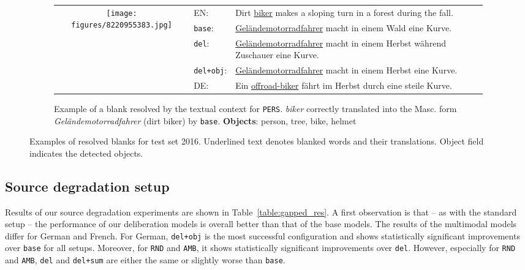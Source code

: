 \documentclass[11pt,a4paper]{article}
\newcommand{\base}{\texttt{base}\xspace}
\newcommand{\delib}{\texttt{del}\xspace}
\newcommand{\delibsum}{\texttt{del+sum}\xspace}
\newcommand{\delibattobj}{\texttt{del+obj}\xspace}
\newcommand{\rnd}{\texttt{RND}\xspace}
\newcommand{\amb}{\texttt{AMB}\xspace}
\newcommand{\pers}{\texttt{PERS}\xspace}
\begin{document}
\begin{figure*}[ht]
{\begin{subfigure}[c]{\textwidth}
  \end{subfigure}
  \begin{subfigure}[c]{\textwidth}
  \vspace{1em}
    \begin{tabular}{c p{1.5cm}p{9cm}}
      \multirow{3}{*}{\texttt{[image: figures/8220955383.jpg]}} & 
      EN: & Dirt \underline{biker} makes a sloping turn in a forest during the fall. \\[1ex]
      & \base: & \underline{Gel\"{a}ndemotorradfahrer} macht in einem Wald eine Kurve.\\[1ex]
      & \delib: & \underline{Gel\"{a}ndemotorradfahrer} macht in einem Herbst w\"{a}hrend Zuschauer eine Kurve.\\[1ex]
      & \delibattobj: & \underline{Gel\"{a}ndemotorradfahrer} macht in einem Herbst eine Kurve. \\[1ex]
      & DE: & Ein \underline{offroad-biker} f\"{a}hrt im Herbst durch eine steile Kurve.  \\[1ex]
  \end{tabular}
  \caption{Example of a blank resolved by the textual context for \pers. \textit{biker} correctly translated into the Masc. form \textit{Gel\"{a}ndemotorradfahrer} (dirt biker) by \base. \textbf{Objects}: person, tree, bike, helmet}
  \end{subfigure}}
\caption{\label{table:gapped_ex} Examples of resolved blanks for test set 2016. Underlined text denotes blanked words and their translations. Object field indicates the detected objects.}
\end{figure*}

\subsection{Source degradation setup}\label{ssec:gaps_results}

Results of our source degradation experiments are shown in Table~\ref{table:gapped_res}. A first observation is that -- as with the standard setup -- the performance of our deliberation models is overall better than that of the base models. The results of the multimodal models differ for German and French. For German, \delibattobj is the most successful configuration and shows statistically significant improvements over \base for all setups. Moreover, for \rnd and \amb, it shows statistically significant improvements over \delib. However, especially for \rnd and \amb, \delib and \delibsum are either the same or slightly worse than \base. 
\end{document}
